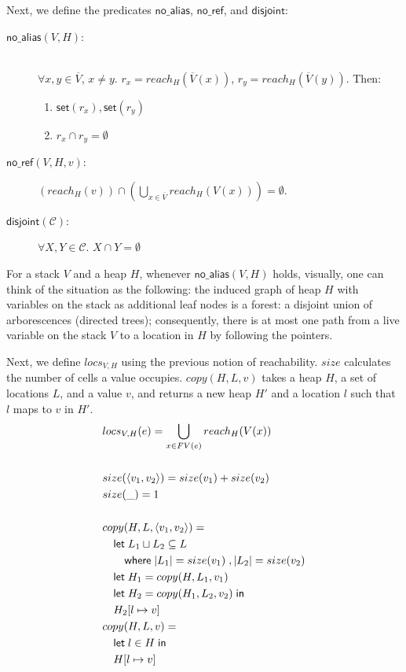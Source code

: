 \documentclass[11pt]{article}
\newcommand{\ms}[1]{\ensuremath{\mathsf{#1}}}
\newcommand{\na}[1]{\mathsf{no\_alias}(#1)}
\newcommand{\dist}[1]{\mathsf{disjoint}(#1)}
\begin{document}
\noindent
Next, we define the predicates $\ms{no\_alias}$, $\ms{no\_ref}$, and $\ms{disjoint}$:
\begin{description}
\item[$\na{V,H}$: ] \\
$\forall x,y \in \overline V$, $x \ne y$.  $r_x = reach_H(\overline V(x))$, $r_y = reach_H(\overline V(y))$. Then:
\begin{enumerate}
\item $\ms{set}(r_x), \ms{set}(r_y)$
\item $r_x \cap r_y = \emptyset$
\end{enumerate}
\item[$\ms{no\_ref}(V,H,v)$: ] $(reach_{H}(v)) \cap (\bigcup_{x \in \overline V} reach_{H}(V(x))) = \emptyset$.
\item[$\dist{\mathcal{C}}$: ] $\forall X,Y \in \mathcal{C}$. $X \cap Y = \emptyset$ 
\end{description}

For a stack $V$ and a heap $H$, whenever $\na{V,H}$ holds, visually, one can think of the situation as the following: the induced graph of heap $H$ with variables on the stack as additional leaf nodes is a forest: a disjoint union of arborescences (directed trees); consequently, there is at most one path from a live variable on the stack $V$ to a location in $H$ by following the pointers.

Next, we define $locs_{V,H}$ using the previous notion of reachability. $size$ calculates the number of cells a value occupies. $copy(H,L,v)$ takes a heap $H$, a set of locations $L$, and a value $v$, and returns a new heap $H'$ and a location $l$ such that $l$ maps to $v$ in $H'$.
\begin{align*}
  &locs_{V,H}(e) = \bigcup\limits_{x \in FV(e)} reach_H(V(x))\\\\
  &size(\langle v_1, v_2\rangle) = size(v_1) + size(v_2)\\
  &size(\_) = 1\\\\
  &copy(H,L,\langle v_1, v_2\rangle) =\\
  &\quad\mathsf{let }\; L_1 \sqcup L_2 \subseteq L\\
  &\quad\quad\mathsf{ where }\; |L_1| = size(v_1) \;,|L_2| = size(v_2)\\
  &\quad\mathsf{let }\; H_1 = copy(H,L_1,v_1) \\
  &\quad\mathsf{let }\; H_2 = copy(H_1,L_2,v_2) \;\mathsf{in}\\
  &\quad H_2[l \mapsto v]\\
  &copy(H,L,v) =\\
  &\quad\mathsf{let }\; l \in H\; \mathsf{in}\\
  &\quad H[l \mapsto v]\\
\end{align*}
\end{document}
